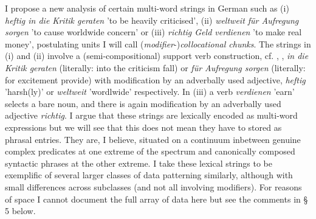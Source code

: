 \documentclass[11pt,a4paper,fleqn]{article}
\begin{document}
I propose a new analysis of certain multi-word strings in German such as (i) \textit{heftig in die
 Kritik geraten} 'to be heavily criticised', (ii) \textit{weltweit für Aufregung sorgen} 'to cause worldwide concern' or 
(iii) \textit {richtig Geld verdienen} 'to make real money',  postulating units I will call (\textit{modifier}-)\textit{collocational chunks}.
 The strings in (i) and (ii) involve a (semi-compositional) support verb
 construction, cf. \citet{KrennErbach1994}, \citet{Steinitz1989}, \textit{in die Kritik geraten} (literally: into the criticism fall)
or \textit{für Aufregung sorgen} (literally: for excitement provide) with modification by an adverbally used adjective,
\textit{heftig} 'harsh(ly)' or \textit{weltweit} 'wordlwide' respectively.\footnotemark 
{} In (iii) a verb \textit{verdienen} 'earn' selects a bare noun,
and there is again modification by an adverbally used adjective \textit{richtig}.\footnotemark  
{} I argue that these strings are lexically encoded as multi-word expressions but we will see that this does not mean they have to 
stored as phrasal entries. They are, I believe, situated on a continuum inbetween genuine complex predicates at
one extreme of the spectrum and canonically composed syntactic phrases at the other
extreme. I take these lexical strings to be exemplific of several larger classes of data patterning similarly, although with small differences
across subclasses (and not all involving modifiers). For reasons of space I cannot document the full array of data 
here but see the comments in § 5  below.
\end{document}
